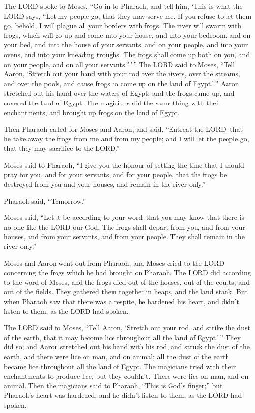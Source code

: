  The LORD spoke to Moses, ``Go in to Pharaoh, and tell
him, `This is what the LORD says, ``Let my people go, that they may
serve me.  If you refuse to let them go, behold, I will
plague all your borders with frogs.  The river will swarm
with frogs, which will go up and come into your house, and into your
bedroom, and on your bed, and into the house of your servants, and on
your people, and into your ovens, and into your kneading troughs.
 The frogs shall come up both on you, and on your people,
and on all your servants.''\,'\,''  The LORD said to
Moses, ``Tell Aaron, `Stretch out your hand with your rod over the
rivers, over the streams, and over the pools, and cause frogs to come up
on the land of Egypt.'\,''  Aaron stretched out his hand
over the waters of Egypt; and the frogs came up, and covered the land of
Egypt.  The magicians did the same thing with their
enchantments, and brought up frogs on the land of Egypt.

 Then Pharaoh called for Moses and Aaron, and said,
``Entreat the LORD, that he take away the frogs from me and from my
people; and I will let the people go, that they may sacrifice to the
LORD.''

 Moses said to Pharaoh, ``I give you the honour of setting
the time that I should pray for you, and for your servants, and for your
people, that the frogs be destroyed from you and your houses, and remain
in the river only.''

 Pharaoh said, ``Tomorrow.''

Moses said, ``Let it be according to your word, that you may know that
there is no one like the LORD our God.  The frogs shall
depart from you, and from your houses, and from your servants, and from
your people. They shall remain in the river only.''

 Moses and Aaron went out from Pharaoh, and Moses cried
to the LORD concerning the frogs which he had brought on Pharaoh.
 The LORD did according to the word of Moses, and the
frogs died out of the houses, out of the courts, and out of the fields.
 They gathered them together in heaps, and the land
stank.  But when Pharaoh saw that there was a respite, he
hardened his heart, and didn't listen to them, as the LORD had spoken.

 The LORD said to Moses, ``Tell Aaron, `Stretch out your
rod, and strike the dust of the earth, that it may become lice
throughout all the land of Egypt.'\,''  They did so; and
Aaron stretched out his hand with his rod, and struck the dust of the
earth, and there were lice on man, and on animal; all the dust of the
earth became lice throughout all the land of Egypt.  The
magicians tried with their enchantments to produce lice, but they
couldn't. There were lice on man, and on animal.  Then
the magicians said to Pharaoh, ``This is God's finger;'' but Pharaoh's
heart was hardened, and he didn't listen to them, as the LORD had
spoken.

